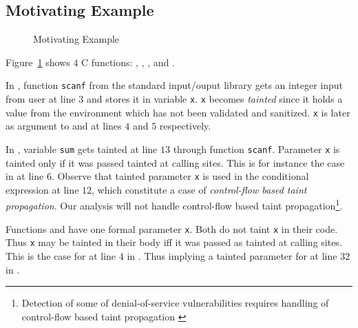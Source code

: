 \subsection{Motivating Example}\label{example} 

\begin{figure}[!h]
\begin{center}
\end{center}
\caption{Motivating Example}
\label{fig:sample}
\end{figure}

Figure~\ref{fig:sample} shows $4$ C functions:
\main, \even, \odd, and \compute.

In \main{}, function \texttt{scanf} from the standard input/ouput
library gets an integer input from user at line $3$
and stores it in variable \texttt{x}. \texttt{x} 
becomes \textit{tainted} since it holds a value from
the environment which has not been validated and
sanitized.
\texttt{x} is later as argument to \even{} and \odd{} at
lines $4$ and $5$ respectively.

In \compute{}, variable \texttt{sum} gets tainted at
line $13$ through function \texttt{scanf}. Parameter
\texttt{x} is tainted only if it was passed tainted
at calling sites.
This is for instance the case in \main{} at line $6$.
Observe that tainted parameter \texttt{x} is used in
the conditional expression at line $12$, which constitute
a case of \textit{control-flow based taint propagation}.
Our analysis will not handle control-flow based taint
propagation\footnote{Detection of some of denial-of-service
vulnerabilities requires handling of control-flow based
taint propagation \cite{Chang:2009:ICS}}. 

Functions \even{} and \odd{} have one formal parameter
\texttt{x}. Both do not taint \texttt{x} in their code.
Thus \texttt{x} may be tainted in their body iff it was
passed as tainted at calling sites. This is the case
for \even{} at line $4$ in \main{}. Thus implying a tainted
parameter for \odd{} at line $32$ in \even{}.

